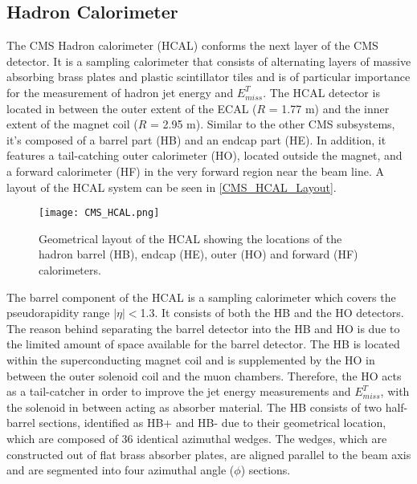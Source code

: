 \subsection{Hadron Calorimeter}

The CMS Hadron calorimeter (HCAL) conforms the next layer of the CMS detector. It is a sampling calorimeter that consists of alternating layers of massive absorbing brass plates and plastic scintillator tiles and is of particular importance for the measurement of hadron jet energy and $E_{miss}^T$. The HCAL detector is located in between the outer extent of the ECAL ($R$ = 1.77 m) and the inner extent of the magnet coil ($R$ = 2.95 m). Similar to the other CMS subsystems, it's composed of a barrel part (HB) and an endcap part (HE). In addition, it features a tail-catching outer calorimeter (HO), located outside the magnet, and a forward calorimeter (HF) in the very forward region near the beam line. A layout of the HCAL system can be seen in \autoref{CMS_HCAL_Layout}.\\

\begin{figure}[tb]
\begin{center}
\texttt{[image: CMS\_HCAL.png]} 
\caption{Geometrical layout of the HCAL showing the locations of the hadron barrel (HB), endcap (HE), outer (HO) and forward (HF) calorimeters\cite{CMShcal}.}
\label{CMS_HCAL_Layout} 
\end{center}
\end{figure}

The barrel component of the HCAL is a sampling calorimeter which covers the pseudorapidity range $|\eta|<$1.3. It consists of both the HB and the HO detectors. The reason behind separating the barrel detector into the HB and HO is due to the limited amount of space available for the barrel detector. The HB is located within the superconducting magnet coil and is supplemented by the HO in between the outer solenoid coil and the muon chambers. Therefore, the HO acts as a tail-catcher in order to improve the jet energy measurements and $E_{miss}^T$, with the solenoid in between acting as absorber material. The HB consists of two half-barrel sections, identified as HB+ and HB- due to their geometrical location, which are composed of 36 identical azimuthal wedges. The wedges, which are constructed out of flat brass absorber plates, are aligned parallel to the beam axis and are segmented into four azimuthal angle ($\phi$) sections.\\ 

